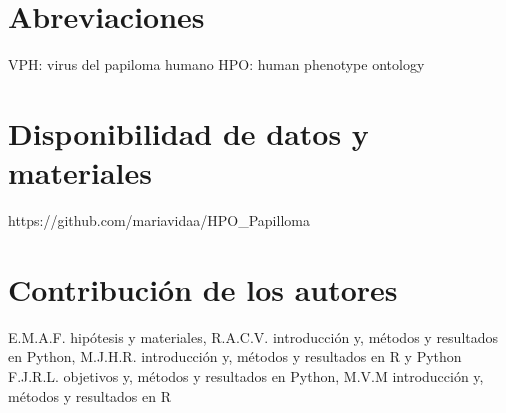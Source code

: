 \documentclass{bmcart}
\begin{document}
	\begin{backmatter}
	
		\section*{Abreviaciones}%
			VPH: virus del papiloma humano
			HPO: human phenotype ontology
		
		\section*{Disponibilidad de datos y materiales}%
			https://github.com/mariavidaa/HPO\_Papilloma
		
		\section*{Contribución de los autores}
			E.M.A.F. hipótesis y materiales, R.A.C.V. introducción y, métodos y resultados en Python, M.J.H.R. introducción y, métodos y resultados en R y Python F.J.R.L. objetivos y, métodos y resultados en Python, M.V.M introducción y, métodos y resultados en R
		
		
		
	
	\end{backmatter}
\end{document}
